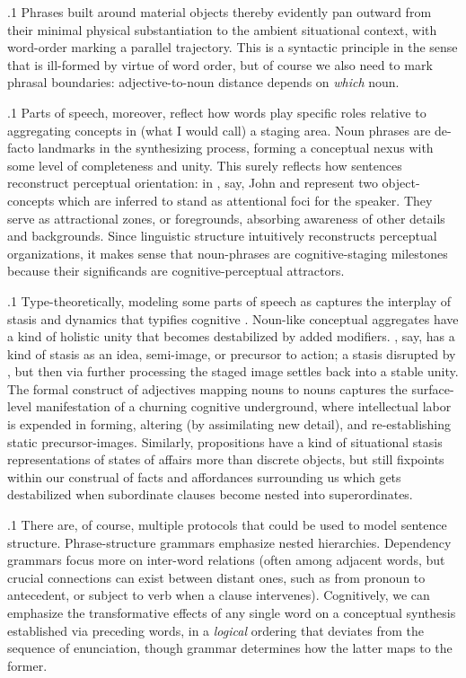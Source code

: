 \documentclass[11pt, twocolumn]{article}
\begin{document}
\p.1{%
Phrases built around material objects thereby evidently
pan outward from their minimal physical substantiation
to the ambient situational context, with word-order
marking a parallel trajectory.  This is a syntactic
principle in the sense that  is ill-formed
by virtue of word order, but of course we also
need to mark phrasal boundaries: adjective-to-noun distance
depends on \textit{which} noun.
} %

\p.1{%
Parts of speech, moreover, reflect how words play
specific roles relative to aggregating concepts in
(what I would call) a  staging area.
Noun phrases are de-facto landmarks in the synthesizing
process, forming a conceptual nexus with some
level of completeness and unity.  This surely reflects
how sentences reconstruct perceptual orientation:
in \jrefs{}, say, John and  represent two
object-concepts which are inferred to stand as
attentional foci for the speaker.  They serve
as attractional zones, or foregrounds, absorbing
awareness of other details and backgrounds.  Since linguistic structure
intuitively reconstructs perceptual organizations,
it makes sense that noun-phrases are cognitive-staging
milestones because their significands are cognitive-perceptual
attractors.
} %

\p.1{%
Type-theoretically, modeling some parts of speech as
 captures the
interplay of stasis and dynamics that typifies
cognitive .  Noun-like conceptual
aggregates have a kind of holistic unity that becomes
destabilized by added modifiers.  , say,
has a kind of stasis as an idea, semi-image, or
precursor to action; a stasis disrupted by , but
then via further processing the staged image settles
back into a stable unity.  The formal construct
of adjectives mapping nouns to nouns captures the
surface-level manifestation of a churning cognitive
underground, where intellectual labor is expended in
forming, altering (by assimilating new detail), and
re-establishing static precursor-images.  Similarly, propositions
have a kind of situational stasis \mdash{} representations of
states of affairs more than
discrete objects, but still fixpoints within
our construal of facts and affordances surrounding us \mdash{}
which gets destabilized when subordinate clauses become nested into
superordinates.
} %

\p.1{%
There are, of course, multiple protocols that could be used
to model sentence structure.  Phrase-structure grammars emphasize
nested hierarchies.  Dependency grammars focus more on
inter-word relations (often among adjacent words, but crucial
connections can exist between distant ones, such as from pronoun
to antecedent, or subject to verb when a clause intervenes).
Cognitively, we can emphasize the transformative effects
of any single word on a conceptual synthesis established
via preceding words, in a \textit{logical} ordering that
deviates from the sequence of enunciation, though grammar
determines how the latter maps to the former.
} %
\end{document}
